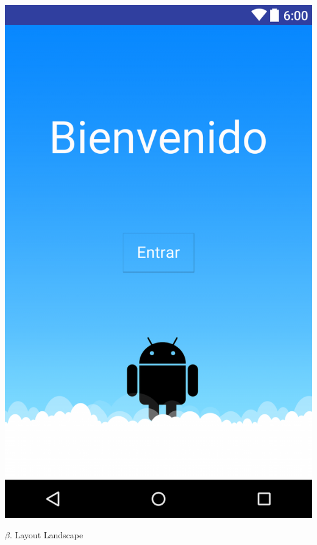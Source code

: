 \documentclass{article}
\begin{document}
\begin{center}

\includegraphics[scale=.15]{layout-2016-04-17-esp_lay.png} 

\end{center}

$\beta$. Layout Landscape\\\\\
\end{document}
